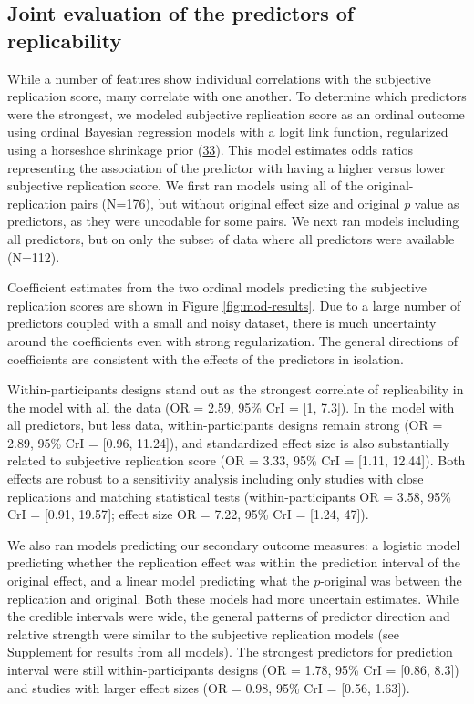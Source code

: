 \documentclass[
  english,
  a4paper,
]{article}
\begin{document}
\hypertarget{joint-evaluation-of-the-predictors-of-replicability}{%
\subsection{Joint evaluation of the predictors of replicability}\label{joint-evaluation-of-the-predictors-of-replicability}}

While a number of features show individual correlations with the subjective replication score, many correlate with one another. To determine which predictors were the strongest, we modeled subjective replication score as an ordinal outcome using ordinal Bayesian regression models with a logit link function, regularized using a horseshoe shrinkage prior (\protect\hyperlink{ref-carvalho09}{33}). This model estimates odds ratios representing the association of the predictor with having a higher versus lower subjective replication score. We first ran models using all of the original-replication pairs (N=176), but without original effect size and original \(p\) value as predictors, as they were uncodable for some pairs. We next ran models including all predictors, but on only the subset of data where all predictors were available (N=112).

Coefficient estimates from the two ordinal models predicting the subjective replication scores are shown in Figure \ref{fig:mod-results}. Due to a large number of predictors coupled with a small and noisy dataset, there is much uncertainty around the coefficients even with strong regularization. The general directions of coefficients are consistent with the effects of the predictors in isolation.

Within-participants designs stand out as the strongest correlate of replicability in the model with all the data (OR = 2.59, 95\% CrI = {[}1, 7.3{]}). In the model with all predictors, but less data, within-participants designs remain strong (OR = 2.89, 95\% CrI = {[}0.96, 11.24{]}), and standardized effect size is also substantially related to subjective replication score (OR = 3.33, 95\% CrI = {[}1.11, 12.44{]}). Both effects are robust to a sensitivity analysis including only studies with close replications and matching statistical tests (within-participants OR = 3.58, 95\% CrI = {[}0.91, 19.57{]}; effect size OR = 7.22, 95\% CrI = {[}1.24, 47{]}).

We also ran models predicting our secondary outcome measures: a logistic model predicting whether the replication effect was within the prediction interval of the original effect, and a linear model predicting what the \(p\)-original was between the replication and original. Both these models had more uncertain estimates. While the credible intervals were wide, the general patterns of predictor direction and relative strength were similar to the subjective replication models (see Supplement for results from all models). The strongest predictors for prediction interval were still within-participants designs (OR = 1.78, 95\% CrI = {[}0.86, 8.3{]}) and studies with larger effect sizes (OR = 0.98, 95\% CrI = {[}0.56, 1.63{]}).
\end{document}
